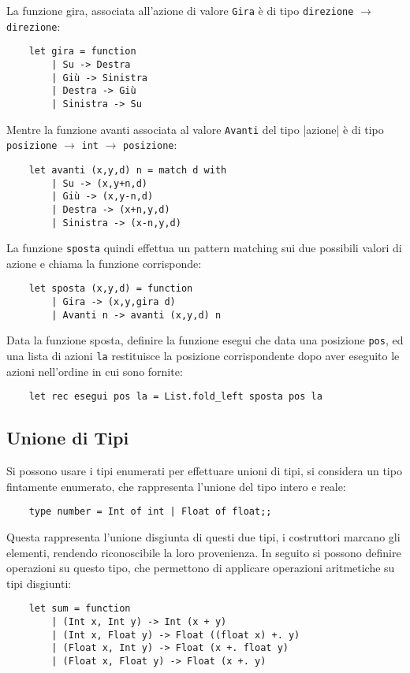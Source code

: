\documentclass{article}
\numberwithin{equation}{subsection}
\begin{document}
La funzione gira, associata all'azione di valore \verb|Gira| è di tipo \verb|direzione| $\rightarrow$ \verb|direzione|:
\begin{verbatim}
    let gira = function
        | Su -> Destra
        | Giù -> Sinistra
        | Destra -> Giù
        | Sinistra -> Su
\end{verbatim}

Mentre la funzione avanti associata al valore \verb|Avanti| del tipo |azione| è di tipo \verb|posizione| $\rightarrow$ \verb|int| $\rightarrow$ \verb|posizione|:
\begin{verbatim}
    let avanti (x,y,d) n = match d with
        | Su -> (x,y+n,d)
        | Giù -> (x,y-n,d)
        | Destra -> (x+n,y,d)
        | Sinistra -> (x-n,y,d)
\end{verbatim}

La funzione \verb|sposta| quindi effettua un pattern matching sui due possibili valori di azione e chiama la funzione corrisponde:
\begin{verbatim}
    let sposta (x,y,d) = function
        | Gira -> (x,y,gira d)
        | Avanti n -> avanti (x,y,d) n
\end{verbatim}


Data la funzione sposta, definire la funzione esegui che data una posizione \verb|pos|, ed una lista di azioni \verb|la| restituisce la posizione corrispondente dopo aver eseguito le azioni nell'ordine in cui sono fornite:
\begin{verbatim}
    let rec esegui pos la = List.fold_left sposta pos la
\end{verbatim}

\subsection{Unione di Tipi}

Si possono usare i tipi enumerati per effettuare unioni di tipi, si considera un tipo fintamente enumerato, che rappresenta l'unione del tipo intero e reale:
\begin{verbatim}
    type number = Int of int | Float of float;; 
\end{verbatim}
Questa rappresenta l'unione disgiunta di questi due tipi, i costruttori marcano gli elementi, rendendo riconoscibile la loro provenienza. In seguito si possono definire operazioni su questo tipo, che permettono di applicare operazioni aritmetiche su tipi disgiunti:
\begin{verbatim}
    let sum = function
        | (Int x, Int y) -> Int (x + y)
        | (Int x, Float y) -> Float ((float x) +. y)
        | (Float x, Int y) -> Float (x +. float y)
        | (Float x, Float y) -> Float (x +. y)    
\end{verbatim}
\end{document}
